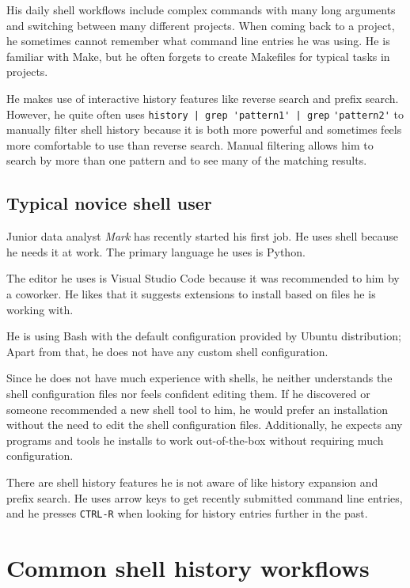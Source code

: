 His daily shell workflows include complex commands with many long arguments and switching between many different projects. When coming back to a project, he sometimes cannot remember what command line entries he was using. He is familiar with Make, but he often forgets to create Makefiles for typical tasks in projects.

He makes use of interactive history features like reverse search and prefix search. However, he quite often uses \verb#history | grep 'pattern1' | grep# \verb#'pattern2'# to manually filter shell history because it is both more powerful and sometimes feels more comfortable to use than reverse search. Manual filtering allows him to search by more than one pattern and to see many of the matching results. 


\subsection{Typical novice shell user}

Junior data analyst \textit{Mark} has recently started his first job. He uses shell because he needs it at work. The primary language he uses is Python. 

The editor he uses is Visual Studio Code because it was recommended to him by a coworker. He likes that it suggests extensions to install based on files he is working with.

He is using Bash with the default configuration provided by Ubuntu distribution; Apart from that, he does not have any custom shell configuration. 

Since he does not have much experience with shells, he neither understands the shell configuration files nor feels confident editing them. If he discovered or someone recommended a new shell tool to him, he would prefer an installation without the need to edit the shell configuration files. Additionally, he expects any programs and tools he installs to work out-of-the-box without requiring much configuration. 

There are shell history features he is not aware of like history expansion and prefix search. He uses arrow keys to get recently submitted command line entries, and he presses \verb|CTRL-R| when looking for history entries further in the past. 



\section{Common shell history workflows}

